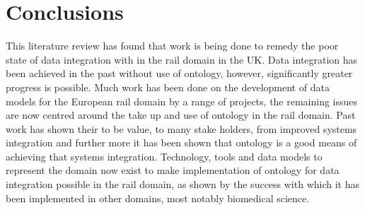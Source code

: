 \section{Conclusions}

This literature review has found that work is being done to remedy the poor state of data integration with in the rail domain in the UK. Data integration has been achieved in the past without use of ontology, however, significantly greater progress is possible. Much work has been done on the development of data models for the European rail domain by a range of projects, the remaining issues are now centred around the take up and use of ontology in the rail domain. Past work has shown their to be value, to many stake holders, from improved systems integration and further more it has been shown that ontology is a good means of achieving that systems integration.  Technology, tools and data models to represent the domain now exist to make implementation of ontology for data integration possible in the rail domain, as shown by the success with which it has been implemented in other domains, most notably biomedical science. 